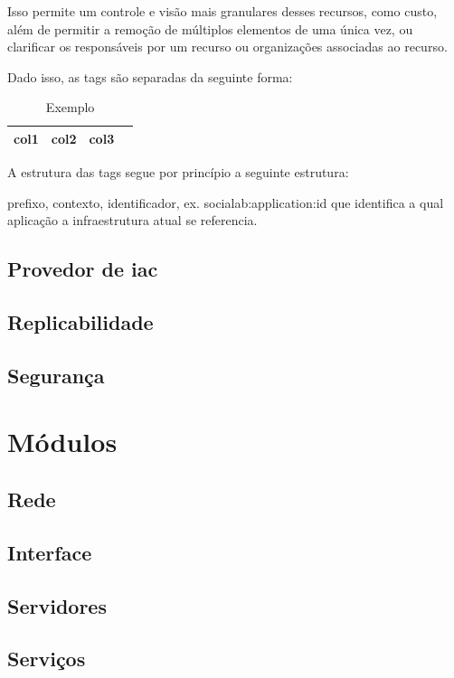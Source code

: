 \documentclass[12pt, a4paper]{report}
\begin{document}
Isso permite um controle e visão mais granulares desses recursos, como custo, além de permitir a remoção de múltiplos elementos de uma única vez, ou clarificar os responsáveis por um recurso ou organizações associadas ao recurso.

Dado isso, as tags são separadas da seguinte forma:

\begin{table}
	\begin{center}
		\begin{tabular}{ |c|c|c|c| }
			\hline
			col1 & col2 & col3 \\
			\hline
		\end{tabular}
	\end{center}
	\caption{Exemplo}\label{table:1}
\end{table}

A estrutura das tags segue por princípio a seguinte estrutura:

prefixo, contexto, identificador, ex. socialab:application:id
que identifica a qual aplicação a infraestrutura atual se referencia.

\section{Provedor de \acrshort{iac}}
\section{Replicabilidade}
\section{Segurança}
\chapter{Módulos}

\section{Rede}
\section{Interface}
\section{Servidores}
\section{Serviços}
\end{document}
